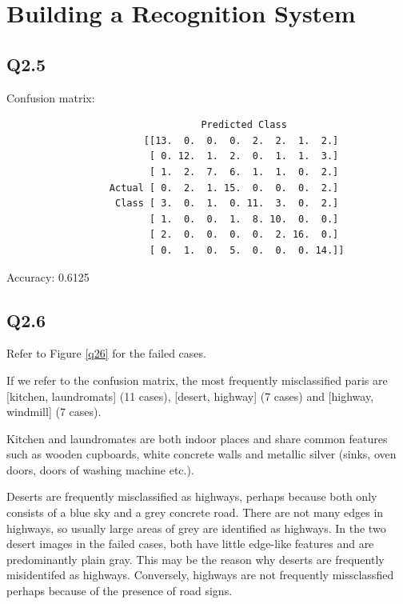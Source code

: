 \documentclass{article} %
\begin{document}
    \section[2]{Building a Recognition System}
    \subsection*{Q2.5}

    Confusion matrix:
    \begin{verbatim}   
                                  Predicted Class
                        [[13.  0.  0.  0.  2.  2.  1.  2.]
                         [ 0. 12.  1.  2.  0.  1.  1.  3.]
                         [ 1.  2.  7.  6.  1.  1.  0.  2.]
                  Actual [ 0.  2.  1. 15.  0.  0.  0.  2.]
                   Class [ 3.  0.  1.  0. 11.  3.  0.  2.]
                         [ 1.  0.  0.  1.  8. 10.  0.  0.]
                         [ 2.  0.  0.  0.  0.  2. 16.  0.]
                         [ 0.  1.  0.  5.  0.  0.  0. 14.]]
    \end{verbatim}
    
    Accuracy: 0.6125

    \subsection*{Q2.6}

    Refer to Figure \ref{q26} for the failed cases.
    \smallskip

    If we refer to the confusion matrix, the most frequently misclassified paris are [kitchen, laundromats] (11 cases), [desert, highway] (7 cases) and [highway, windmill] (7 cases).
    \smallskip

    Kitchen and laundromates are both indoor places and share common features such as wooden cupboards, white concrete walls and metallic silver (sinks, oven doors, doors of washing machine etc.).
    \smallskip 
    
    Deserts are frequently misclassified as highways, perhaps because both only consists of a blue sky and a grey concrete road. There are not many edges in highways, so usually large areas of grey are identified as highways. In the two desert images in the failed cases, both have little edge-like features and are predominantly plain gray. This may be the reason why deserts are frequently misidentifed as highways. Conversely, highways are not frequently missclassfied perhaps because of the presence of road signs.
    \smallskip
\end{document}
